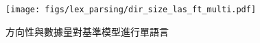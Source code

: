 \begin{figure}[h]
    \centering
    \texttt{[image: figs/lex\_parsing/dir\_size\_las\_ft\_multi.pdf]}
    \caption{方向性與數據量對基準模型進行單語言}
    \label{fig:dir-size-las-ft-multi}
\end{figure}